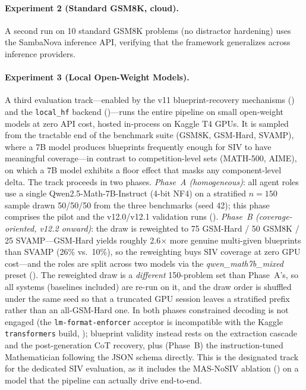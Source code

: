 \documentclass[11pt,a4paper]{article}
\begin{document}
\paragraph{Experiment 2 (Standard GSM8K, cloud).}
A second run on 10 standard GSM8K problems (no distractor hardening) uses the SambaNova inference API, verifying that the framework generalizes across inference providers.
\paragraph{Experiment 3 (Local Open-Weight Models).}
A third evaluation track---enabled by the v11 blueprint-recovery mechanisms () and the \texttt{local\_hf} backend ()---runs the entire pipeline on small open-weight models at zero API cost, hosted in-process on Kaggle T4 GPUs.
It is sampled from the tractable end of the benchmark suite (GSM8K, GSM-Hard, SVAMP), where a 7B model produces blueprints frequently enough for SIV to have meaningful coverage---in contrast to competition-level sets (MATH-500, AIME), on which a 7B model exhibits a floor effect that masks any component-level delta.
The track proceeds in two phases.
\emph{Phase~A (homogeneous)}: all agent roles use a single Qwen2.5-Math-7B-Instruct (4-bit NF4) on a stratified $n{=}150$ sample drawn 50/50/50 from the three benchmarks (seed 42); this phase comprises the pilot and the v12.0/v12.1 validation runs ().
\emph{Phase~B (coverage-oriented, v12.2 onward)}: the draw is reweighted to 75 GSM-Hard / 50 GSM8K / 25 SVAMP---GSM-Hard yields roughly 2.6$\times$ more genuine multi-given blueprints than SVAMP (26\% vs.\ 10\%), so the reweighting buys SIV coverage at zero GPU cost---and the roles are split across two models via the \textit{qwen\_math7b\_mixed} preset ().
The reweighted draw is a \emph{different} 150-problem set than Phase~A's, so all systems (baselines included) are re-run on it, and the draw order is shuffled under the same seed so that a truncated GPU session leaves a stratified prefix rather than an all-GSM-Hard one.
In both phases constrained decoding is not engaged (the \texttt{lm-format-enforcer} acceptor is incompatible with the Kaggle \texttt{transformers} build, ); blueprint validity instead rests on the extraction cascade and the post-generation CoT recovery, plus (Phase~B) the instruction-tuned Mathematician following the JSON schema directly.
This is the designated track for the dedicated SIV evaluation, as it includes the MAS-NoSIV ablation () on a model that the pipeline can actually drive end-to-end.
\end{document}
